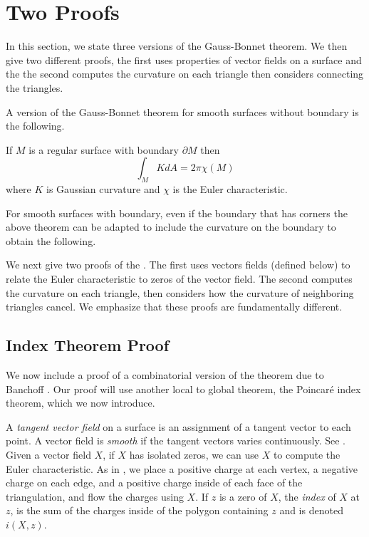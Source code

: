 \section{Two Proofs}


In this section, we state three versions of the Gauss-Bonnet theorem.
We then give two different proofs, the first uses properties of vector fields
on a surface and the the second computes the curvature on each triangle
then considers connecting the triangles.


A version of the Gauss-Bonnet theorem for smooth surfaces without boundary is the following.

\begin{theorem} \label{thm:g-b-nb}

If $M$ is a regular surface with boundary $\partial M$ then
	$$\int_{M} K dA = 2\pi \chi(M)$$
	where  $K$ is Gaussian curvature and
	$\chi$ is the Euler characteristic.
\end{theorem}

For smooth surfaces with boundary, even if the boundary that has corners
the above theorem can be adapted to include the curvature on the boundary
to obtain the following.





We next give two proofs of the . The first uses vectors fields (defined below)
to relate the Euler characteristic to zeros of the vector field. The second computes
the curvature on each triangle, then considers how the curvature of neighboring triangles
cancel. We emphasize that these proofs are fundamentally different.

\subsection{Index Theorem Proof}



We now include a proof of a combinatorial version of the theorem due to Banchoff
\cite{banchoff_critical_1970}. Our proof will use another local to global theorem,
the Poincar\'e index theorem, which we now introduce.

A \emph{tangent vector field} on a surface is an assignment of a tangent
vector to each point. A vector field is \emph{smooth} if the tangent vectors
varies continuously. See .
Given a vector field $X$, if $X$ has isolated zeros, we
can use $X$ to compute the Euler characteristic.
As in , we place a positive charge at each vertex, a negative charge on
each edge, and a positive charge inside of each face of the triangulation, and flow
the charges using $X$. If $z$ is a zero of $X$, the \emph{index} of $X$ at $z$,
is the sum of the charges inside of the polygon containing $z$ and is denoted
$i(X,z).$

